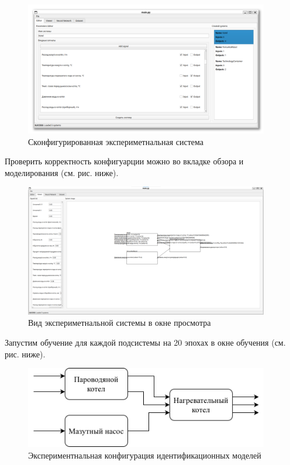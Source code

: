 \begin{figure}[H]
  \begin{center}
    \includegraphics[width=0.95\textwidth]{figures/modules/editor.png}
  \end{center}
  \caption{Сконфигурированная экспериметнальная
  система}\label{fig:test:configured_system}
\end{figure}

Проверить корректность конфигуарции можно во вкладке обзора и моделирования (см.
рис. ниже). 

\begin{figure}[H]
  \begin{center}
    \includegraphics[width=0.95\textwidth]{figures/modules/modelling.png}
  \end{center}
  \caption{Вид экспериметнальной системы в окне
  просмотра}\label{fig:test:preview}
\end{figure}

Запустим обучение для каждой подсистемы на 20 эпохах в окне обучения (см. рис.
ниже). 

\begin{figure}[H]
  \begin{center}
    \includegraphics[width=0.95\textwidth]{figures/subsystem_diagram.png}
  \end{center}
  \caption{Экспериментнальная конфигурация идентификационных
  моделей}\label{fig:test:neural_form}
\end{figure}

